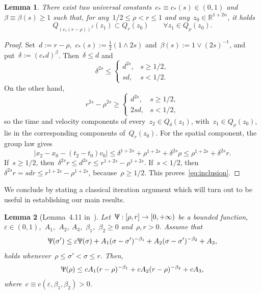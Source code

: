 \documentclass[leqno,10pt]{amsart}
\theoremstyle{plain}
\newtheorem{lemma}{Lemma}[section]
\theoremstyle{remark}
\numberwithin{equation}{section}
\def\er{\mathbb{R}}
\newcommand{\eps}{\varepsilon}
\begin{document}
{\begin{lemma}\label{lemma:cov}
There exist two universal constants~$c_* \equiv c_*(s) \in (0,1)$ and~$\beta \equiv \beta(s) \geq 1$ such that, for any~$1/2 \leq \rho < r \leq 1$ and any~$z_{0} \in \er^{1+2n}$, it holds
\begin{equation}\label{eq:inclusion}
{Q}_{(c_*(r - \rho))^\beta}(z_1) \subset {Q}_{r}(z_{0}) \qquad \forall z_1 \in {Q}_{\rho}(z_{0}).
\end{equation}
\end{lemma}
   \begin{proof}
Set~$d:=r-\rho$,~$c_*(s):=\frac12(1\wedge2s)$ and~$\beta(s):=1\vee(2s)^{-1}$, and put~$\delta:=(c_*d)^\beta$. Then~$\delta\leq d$ and
\[
\delta^{2s}\leq
\begin{cases}
d^{2s},&s\geq1/2,\\
sd,&s<1/2.
\end{cases}
\]
On the other hand,
\[
r^{2s}-\rho^{2s}\geq
\begin{cases}
d^{2s},&s\geq1/2,\\
2sd,&s<1/2,
\end{cases}
\]
so the time and velocity components of every~$z_2\in Q_\delta(z_1)$, with~$z_1\in Q_\rho(z_0)$, lie in the corresponding components of~$Q_r(z_0)$. For the spatial component, the group law gives
\[
|x_2-x_0-(t_2-t_0)v_0|
\leq \delta^{1+2s}+\rho^{1+2s}+\delta^{2s}\rho
\leq \rho^{1+2s}+\delta^{2s}r.
\]
If~$s\geq1/2$, then~$\delta^{2s}r\leq d^{2s}r\leq r^{1+2s}-\rho^{1+2s}$. If~$s<1/2$, then~$\delta^{2s}r=sd r\leq r^{1+2s}-\rho^{1+2s}$, because~$\rho\geq1/2$. This proves~\eqref{eq:inclusion}.
 \end{proof}





    We conclude by stating a classical iteration argument which will turn out to be useful in establishing our main results.

   \begin{lemma}[Lemma~4.11 in~\cite{Coz17}]\label{lemma_giusti}
Let~$\Uppsi:[{\rho}, {r}] \rightarrow [0,+\infty)$ be a 
bounded function,~$\eps \in (0,1)$,~$A_1,$ $A_2$, $A_3$,~$\beta_1$,~$\beta_2 \geq 0$ and~${\rho}, {r} > 0$. Assume that
\[
\Uppsi(\sigma') \leq \eps \Uppsi(\sigma) + {{A}_1}{(\sigma-\sigma')^{-\beta_1}}+ {{A}_2}{(\sigma-\sigma')^{-\beta_2}} + A_3,
\]
holds whenever~${\rho} \leq  \sigma' < \sigma \leq  {r}.$ Then, 
\[
\Uppsi({\rho}) \leq  c{A_1}{({r} - {\rho})^{-\beta_1}} +  c{A_2}{({r} - {\rho})^{-\beta_2}} + cA_3,
\]
where~$c\equiv c(\eps, \beta_1,\beta_2) > 0.$
\end{lemma}



}
\end{document}
